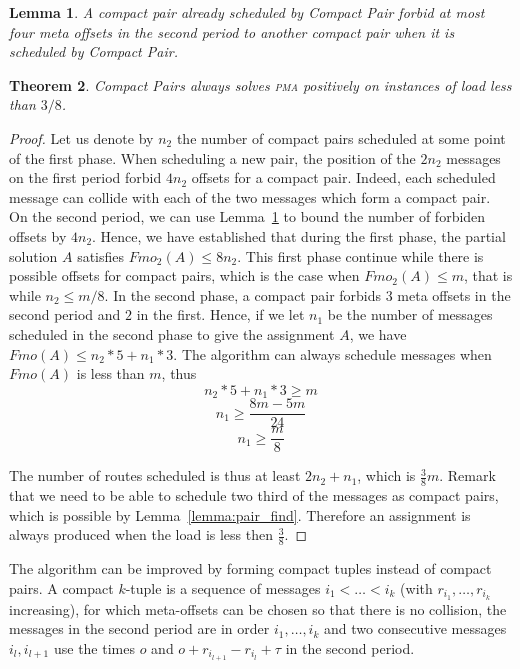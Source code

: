 \documentclass[10pt, conference, letterpaper]{IEEEtran}
\newtheorem{theorem}{Theorem}
\newtheorem{lemma}[theorem]{Lemma}
\newcommand\pma{\textsc{pma}\xspace}
\begin{document}
\begin{lemma}\label{lemma:pair_forbid}
A compact pair already scheduled by Compact Pair forbid at most four meta offsets in the second period to another compact pair when it is scheduled by Compact Pair.
\end{lemma}

\begin{theorem}
Compact Pairs always solves \pma positively on instances of load less than
$3/8$.
\end{theorem}
\begin{proof}
Let us denote by $n_2$ the number of compact pairs scheduled at some point of 
the first phase. When scheduling a new pair, the position of the $2n_2$ messages on the first
period forbid $4n_2$ offsets for a compact pair. Indeed, each scheduled message can collide
with each of the two messages which form a compact pair. On the second period, we can use Lemma~\ref{lemma:pair_forbid} to bound the number of forbiden offsets by $4n_2$. 
Hence, we have established that during the first phase, the partial solution $A$
satisfies $Fmo_2(A) \leq 8n_2$. This first phase continue while there is possible offsets for compact pairs, which is the case when $Fmo_2(A) \leq m$, that is while $n_2 \leq m/8$.
In the second phase, a compact pair forbids $3$ meta offsets in the 
second period and $2$ in the first. Hence, if we let $n_1$ be the number of messages scheduled in the second phase to give the assignment $A$, we have $Fmo(A) \leq n_2*5 + n_1*3$. 
The algorithm can always schedule messages when $Fmo(A)$ is less than $m$, thus
$$ n_2*5 + n_1*3 \geq m$$
$$ n_1 \geq \frac{8m - 5m }{24}$$
$$n_1 \geq \frac{m}{8}$$

The number of routes scheduled is thus at least $2n_2 + n_1$,
which is $\frac{3}{8}m$. Remark that we need to be able to schedule two third of the messages as compact pairs, which is possible by Lemma~\ref{lemma:pair_find}. Therefore an assignment is always produced when the load is less then $\frac{3}{8}$.
\end{proof}

The algorithm can be improved by forming compact tuples instead of compact pairs.
A compact $k$-tuple is a sequence of messages $i_1 < \dots < i_k$ (with $r_{i_1},\dots,r_{i_k}$ increasing), for which meta-offsets can be chosen so that there is no collision,
the messages in the second period are in order $i_1,\dots,i_k$ and two consecutive messages $i_{l},i_{l+1}$ use the times $o$ and $o + r_{i_{l+1}} -r_{i_{l}} + \tau$ in the second period.
\end{document}

